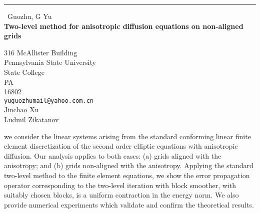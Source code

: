 \documentclass{report}
\begin{document}
\begin{center}
\rule{6in}{1pt} \
{\large Guozhu, G Yu \\
{\bf Two-level method for anisotropic diffusion equations on non-aligned grids}}

316 McAllister Building \\ Pennsylvania State University \\ State College \\ PA \\ 16802
\\
{\tt yuguozhumail@yahoo.com.cn}\\
Jinchao Xu\\
Ludmil Zikatanov\end{center}

we consider the linear systems arising from the standard conforming
linear finite element discretization of the second order elliptic
equations with anisotropic diffusion. Our analysis applies to both cases:
(a) grids aligned with the anisotropy; and (b) grids non-aligned with the
anisotropy. Applying the standard two-level method to the finite element
equations, we show the error propagation operator corresponding to the
two-level iteration with block smoother, with suitably chosen blocks, is
a uniform contraction in the energy norm. We also provide numerical
experiments which validate and confirm the theoretical results.
\end{document}
